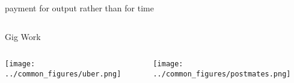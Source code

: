 \documentclass[presentation]{subfiles}
\begin{document}
\begin{frame}[t]{payment for output rather than for time}
{\begin{columns}[b]
      \begin{column}[t]{0.45\textwidth}
        \centering
        Gig Work

        \vspace{0.5em}

        \begin{columns}
          \begin{column}{.5\textwidth}
            \texttt{[image: ../common\_figures/uber.png]}
          \end{column}
          \begin{column}{.5\textwidth}
            \texttt{[image: ../common\_figures/postmates.png]}
          \end{column}
        \end{columns}
      \end{column}
    \end{columns}
  }
\end{frame}


\begin{frame} %

      \centering
        
\end{frame}
\end{document}
